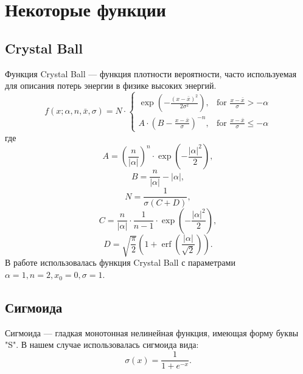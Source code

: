 \chapter{Некоторые функции}

\section{Crystal Ball}\label{sec:crystalball}

Функция Crystal Ball --- функция плотности вероятности, часто используемая для описания потерь энергии в физике высоких энергий.
$$f(x;\alpha,n,\bar x,\sigma) = N \cdot \begin{cases} \exp(- \frac{(x - \bar x)^2}{2 \sigma^2}), & \mbox{for }\frac{x - \bar x}{\sigma} > -\alpha \\
 A \cdot (B - \frac{x - \bar x}{\sigma})^{-n}, & \mbox{for }\frac{x - \bar x}{\sigma} \leq -\alpha \end{cases}$$
где
$$A = \left(\frac{n}{\left| \alpha \right|}\right)^n \cdot \exp\left(- \frac {\left| \alpha \right|^2}{2}\right),$$
$$B = \frac{n}{\left| \alpha \right|}  - \left| \alpha \right|,$$
$$N = \frac{1}{\sigma (C + D)},$$
$$C = \frac{n}{\left| \alpha \right|} \cdot \frac{1}{n-1} \cdot \exp\left(- \frac {\left| \alpha \right|^2}{2}\right),$$
$$D = \sqrt{\frac{\pi}{2}} \left(1 + \operatorname{erf}\left(\frac{\left| \alpha \right|}{\sqrt 2}\right)\right).$$
В работе использовалась функция Crystal Ball с параметрами $\alpha=1, n=2, x_0=0, \sigma=1$.

\section{Сигмоида}\label{sec:sigmoida}

Сигмоида --- гладкая монотонная нелинейная функция, имеющая форму буквы "S". В нашем случае использовалась сигмоида вида:
$$\sigma(x) = \frac{1}{1+e^{-x}}.$$
